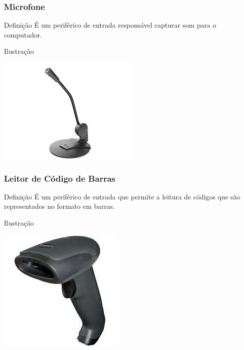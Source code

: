 \documentclass[aspectratio=169]{beamer} %
\begin{document}
\begin{frame}
	\frametitle{Microfone}
	
	\begin{block}{Defini\c cão}
		É um periférico de entrada responsável capturar som para o computador.
	\end{block}\vfill
	
	\begin{exampleblock}{Ilustra\c cão}
		\begin{center}
			\includegraphics[scale=0.4]{img/microfone}
		\end{center}				
	\end{exampleblock}
\end{frame}

\begin{frame}
	\frametitle{Leitor de Código de Barras}
	
	\begin{block}{Defini\c cão}
		É um periférico de entrada que permite a leitura de códigos que são representados no formato em barras.
	\end{block}\vfill
	
	\begin{exampleblock}{Ilustra\c cão}
		\begin{center}
			\includegraphics[scale=0.4]{img/leitor_de_codigo_de_barras}
		\end{center}				
	\end{exampleblock}
\end{frame}
\end{document}
